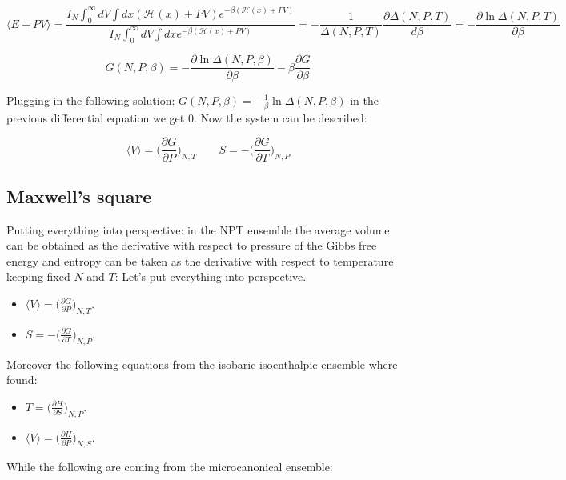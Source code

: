 	$$\langle E + PV\rangle = \frac{I_N\int_0^{\infty} dV\int dx(\mathcal{H}(x) + PV)e^{-\beta(\mathcal{H}(x)+PV)}}{I_N\int_0^{\infty}dV\int dxe^{-\beta(\mathcal{H}(x) + PV)}} = -\frac{1}{\Delta(N, P, T)}\frac{\partial \Delta(N, P, T)}{d\beta} = -\frac{\partial\ln\Delta(N, P, T)}{\partial \beta}$$


	$$G(N, P, \beta) = -\frac{\partial\ln\Delta(N, P, \beta)}{\partial\beta}-\beta\frac{\partial G}{\partial \beta}$$

	Plugging in the following solution: $G(N, P, \beta) = -\frac{1}{\beta}\ln\Delta(N, P, \beta)$ in the previous differential equation we get $0$.
	Now the system can be described:

	$$\langle V\rangle = \biggl(\frac{\partial G}{\partial P}\biggr)_{N, T}\qquad S = -\biggl(\frac{\partial G}{\partial T}\biggr)_{N, P}$$

	\subsection{Maxwell's square}
	Putting everything into perspective: in the NPT ensemble the average volume can be obtained as the derivative with respect to pressure of the Gibbs free energy and entropy can be taken as the derivative with respect to temperature keeping fixed $N$ and $T$:
	Let's put everything into perspective.

	\begin{multicols}{2}
		\begin{itemize}
			\item $\langle V\rangle = \biggl(\frac{\partial G}{\partial P}\biggr)_{N, T}$.
			\item $S = -\biggl(\frac{\partial G}{\partial T}\biggr)_{N, P}$.
		\end{itemize}
	\end{multicols}

	Moreover the following equations from the isobaric-isoenthalpic ensemble where found:

	\begin{multicols}{2}
		\begin{itemize}
			\item $T = \biggl(\frac{\partial H}{\partial S}\biggr)_{N, P}$.
			\item $\langle V\rangle = \biggl(\frac{\partial H}{\partial P}\biggr)_{N, S}$.
		\end{itemize}
	\end{multicols}

	While the following are coming from the microcanonical ensemble:

